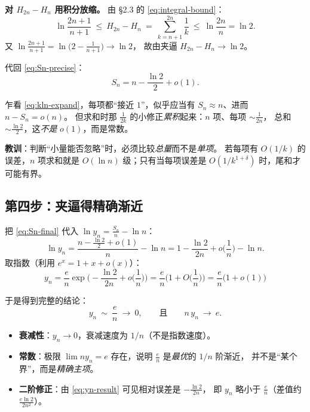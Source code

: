 \documentclass[11pt,a4paper]{ctexart}
\theoremstyle{definition}
\theoremstyle{remark}
\begin{document}
\textbf{对 $H_{2n}-H_n$ 用积分放缩。} 由 \S 2.3 的 \eqref{eq:integral-bound}：
\[
  \ln\frac{2n+1}{n+1}\ \le\ H_{2n}-H_n\ =\ \sum_{k=n+1}^{2n}\frac1k
  \ \le\ \ln\frac{2n}{n}=\ln2 .
\]
又 $\ln\frac{2n+1}{n+1}=\ln\Big(2-\frac{1}{n+1}\Big)\to\ln2$，
故由夹逼 $H_{2n}-H_n\to\ln2$。

代回 \eqref{eq:Sn-precise}：
\begin{equation}\label{eq:Sn-final}
  S_n=n-\frac{\ln2}{2}+o(1).
\end{equation}

\begin{warnbox}[一个极易犯的错误]
乍看 \eqref{eq:kln-expand}，每项都“接近 $1$”，似乎应当有 $S_n\approx n$、进而 $n-S_n=o(n)$。
但求和时那 $\frac{1}{2k}$ 的小修正\emph{累积}起来：$n$ 项、每项 $\sim\frac{1}{2n}$，
总和 $\sim\frac{\ln2}{2}$，这\emph{不是} $o(1)$，而是常数。
\par\smallskip
\textbf{教训}：判断“小量能否忽略”时，必须比较\emph{总量}而不是\emph{单项}。
若每项有 $O(1/k)$ 的误差，$n$ 项求和就是 $O(\ln n)$ 级；只有当每项误差是 $O(1/k^{1+\delta})$
时，尾和才可能有界。
\end{warnbox}

\subsection{第四步：夹逼得精确渐近}

把 \eqref{eq:Sn-final} 代入 $\ln y_n=\frac{S_n}{n}-\ln n$：
\[
  \ln y_n=\frac{n-\frac{\ln2}{2}+o(1)}{n}-\ln n
  =1-\frac{\ln2}{2n}+o\Big(\frac1n\Big)-\ln n .
\]
取指数（利用 $e^{x}=1+x+o(x)$）：
\begin{equation}\label{eq:yn-result}
  \boxed{\;
  y_n=\frac{e}{n}\exp\Big(-\frac{\ln 2}{2n}+o\Big(\frac1n\Big)\Big)
     =\frac{e}{n}\Big(1+O\Big(\frac1n\Big)\Big)
     =\frac{e}{n}\big(1+o(1)\big)\;}
\end{equation}

于是得到完整的结论：
\[
  y_n\ \sim\ \frac{e}{n}\ \longrightarrow\ 0,
  \qquad\text{且}\qquad n\,y_n\ \longrightarrow\ e .
\]

\begin{keybox}[结论的双重含义]
\begin{itemize}
  \item \textbf{衰减性}：$y_n\to0$，衰减速度为 $1/n$（不是指数速度）。
  \item \textbf{常数}：极限 $\lim n y_n=e$ 存在，说明 $\frac en$ 是\emph{最优}的 $1/n$ 阶渐近，
        并不是“某个界”，而是\emph{精确主项}。
  \item \textbf{二阶修正}：由 \eqref{eq:yn-result} 可见相对误差是 $-\frac{\ln2}{2n}$，
        即 $y_n$ 略小于 $\frac{e}{n}$（差值约 $\frac{e\ln2}{2n^{2}}$）。
\end{itemize}
\end{keybox}
\end{document}
